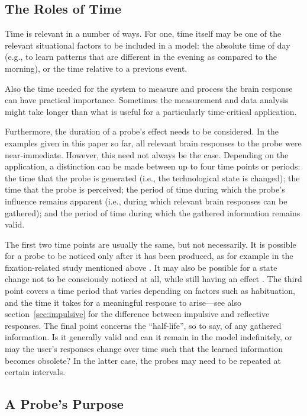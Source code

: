 \subsection{The Roles of Time}

Time is relevant in a number of ways. For one, time itself may be one of the relevant situational factors to be included in a model: the absolute time of day (e.g., to learn patterns that are different in the evening as compared to the morning), or the time relative to a previous event.

Also the time needed for the system to measure and process the brain response can have practical importance. Sometimes the measurement and data analysis might take longer than what is useful for a particularly time-critical application.

Furthermore, the duration of a probe's effect needs to be considered. In the examples given in this paper so far, all relevant brain responses to the probe were near-immediate. However, this need not always be the case. Depending on the application, a distinction can be made between up to four time points or periods: the time that the probe is generated (i.e., the technological state is changed); the time that the probe is perceived; the period of time during which the probe's influence remains apparent (i.e., during which relevant brain responses can be gathered); and the period of time during which the gathered information remains valid.

The first two time points are usually the same, but not necessarily. It is possible for a probe to be noticed only after it has been produced, as for example in the fixation-related study mentioned above \cite{wenzel2017wordrelevance}. It may also be possible for a state change not to be consciously noticed at all, while still having an effect \cite{negri2014subliminal}. The third point covers a time period that varies depending on factors such as habituation, and the time it takes for a meaningful response to arise---see also section~\ref{sec:impulsive} for the difference between impulsive and reflective responses. The final point concerns the ``half-life'', so to say, of any gathered information. Is it generally valid and can it remain in the model indefinitely, or may the user's responses change over time such that the learned information becomes obsolete? In the latter case, the probes may need to be repeated at certain intervals.


\subsection{A Probe's Purpose}
\label{sec:purpose}

